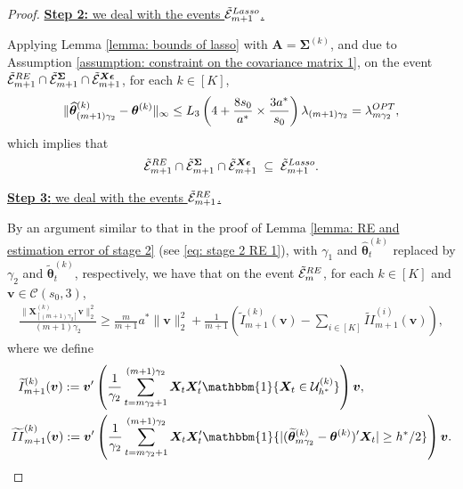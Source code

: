 \documentclass[10pt,a4paper]{amsart}
\newcommand{\bA}{\boldsymbol{A}}
\newcommand{\bSigma}{\boldsymbol{\Sigma}}
\newcommand{\bX}{\boldsymbol{X}}
\newcommand{\bd}[1]{\boldsymbol{#1}}
\newcommand{\bepsilon}{\bd{\epsilon}}
\newcommand{\btheta}{\boldsymbol{\theta}}
\newcommand{\bv}{\boldsymbol{v}}
\newcommand{\hbtheta}{\widehat{\boldsymbol{\theta}}}
\newcommand{\hdlambda}{\lambda^{\textup{OPT}}}
\newcommand{\idf}{\mathbbm{1}}
\newcommand{\mC}{\mathcal{C}}
\newcommand{\mE}{\mathcal{E}}
\newcommand{\tbtheta}{\widetilde{\boldsymbol{\theta}}}
\begin{document}
\begin{proof}
\medskip


\noindent \underline{\textbf{Step 2:} we deal with the events 
$\tilde{\mE}_{m+1}^{\textup{Lasso}}$.} 



Applying Lemma \ref{lemma: bounds of lasso}
with $\bA = \bSigma^{(k)}$, and due to Assumption \ref{assumption: constraint on the covariance matrix 1}, on the event $\tilde{\mE}_{m+1}^{\textup{RE}} \cap \tilde{\mE}_{m+1}^{\bSigma} \cap \tilde{\mE}_{m+1}^{\bX\bepsilon}$, for each $k \in [K]$,
$$
\|\hbtheta_{(m+1)\gamma_2}^{(k)} - \btheta^{(k)}\|_{\infty} \leq L_3\left(4 + \frac{8s_0}{a^*}  \times \frac{3a^*}{s_0}  \right) \lambda_{(m+1)\gamma_2} = \hdlambda_{m\gamma_2},
$$
which implies that
\begin{align}
    \label{aux:stage3_Lasso_event}
\tilde{\mE}_{m+1}^{\textup{RE}} \cap \tilde{\mE}_{m+1}^{\bSigma} \cap \tilde{\mE}_{m+1}^{\bX\bepsilon} \; \subseteq \;
      \tilde{\mE}_{m+1}^{\textup{Lasso}}.
\end{align}





\medskip
\noindent \underline{\textbf{Step 3:} we deal with the events 
$\tilde{\mE}_{m+1}^{\textup{RE}}$.} 

By an argument similar to that in the proof of Lemma \ref{lemma: RE and estimation error of stage 2} (see \eqref{eq: stage 2 RE 1}), with $\gamma_1$ and $\hbtheta_t^{(k)}$ replaced by $\gamma_2$ and $\tbtheta_t^{(k)}$, respectively, we have that on the event $\tilde{\mE}_{m}^{\textup{RE}}$, for each $k \in [K]$ and $\bv\in \mC(s_0,3)$,
\begin{equation*}
\begin{aligned}
   \frac{\|\bX_{[(m+1)\gamma_2]}^{(k)} \bv\|_2^2}{(m+1)\gamma_2} \geq \frac{m}{m+1} a^*\|\bv\|_2^2 + \frac{1}{m+1} \left(\widetilde{I}_{m+1}^{(k)}(\bv) - \sum_{i \in [K]} \widetilde{II}_{m+1}^{(i)}(\bv) \right), 
\end{aligned}
\end{equation*}
where we define 
\begin{equation*} 
\begin{aligned}
\begin{aligned}
& \;\; \widetilde{I}_{m+1}^{(k)}(\bv)  :=  \bv'\left(\frac{1}{\gamma_2}\sum_{t=m\gamma_2+1}^{(m+1)\gamma_2} \bX_t\bX_t'\idf\{\bX_t\in \mathcal{U}_{h^*}^{(k)}\} \right) \bv, \\
    &\widetilde{II}_{m+1}^{(k)}(\bv) :=   \bv'\left(\frac{1}{\gamma_2}\sum_{t=m\gamma_2+1}^{(m+1)\gamma_2} \bX_t\bX_t'\idf\{|(\tbtheta_{m\gamma_2}^{(k)}-\btheta^{(k)})'\bX_t|\ge h^*/2\} \right) \bv.
\end{aligned}
\end{aligned}
\end{equation*}


\end{proof}
\end{document}
